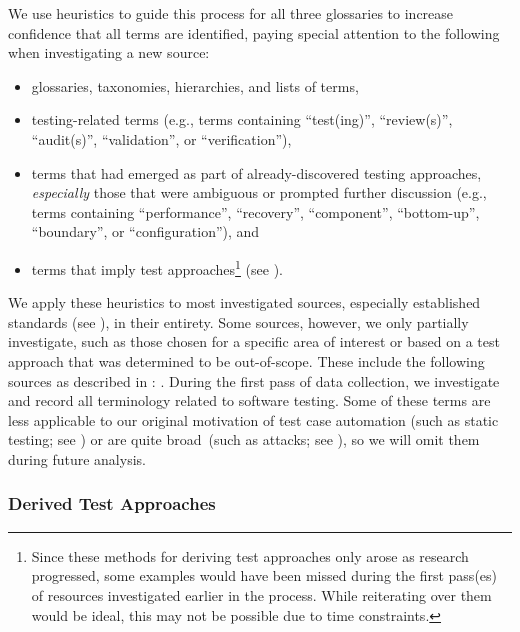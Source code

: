 We use heuristics to guide this process for all three
glossaries to increase confidence that all terms are identified, paying
special attention to the following when investigating a new source:
\begin{itemize}
    \item glossaries, taxonomies, hierarchies, and lists of terms,
    \item testing-related terms (e.g., terms containing ``test(ing)'',
          \ifnotpaper ``review(s)'', ``audit(s)'', \fi
          ``validation'', or ``verification''),
    \item terms that had emerged as part of already-discovered
          testing approaches, \emph{especially} those that were ambiguous
          or prompted further discussion (e.g., terms containing
          ``performance'', ``recovery'', ``component'', ``bottom-up'',
          \ifnotpaper ``boundary'', \fi or ``configuration''), and
    \item terms that imply test approaches\ifnotpaper\footnote{
                  Since these methods for deriving test approaches only arose
                  as research progressed, some examples would have been missed
                  during the first pass(es) of resources investigated earlier
                  in the process. While reiterating over them would be ideal,
                  this may not be possible due to time constraints.
              } (see )\fi.
\end{itemize}
We apply these heuristics to most investigated sources, especially established
standards (see ), in their entirety. Some sources, however, we only
partially investigate, such as those chosen for a specific area of
interest or based on a test approach that was determined to be out-of-scope.
These include the following sources as described in :
\citet{ISO2022,ISO2015,Dominguez-PumarEtAl2020,PierreEtAl2017,
    TrudnowskiEtAl2017,YuEtAl2011,Tsui2007,Goralski1999}.
During the first pass of data collection, we investigate and record all
terminology related to software testing. Some of these terms are less
applicable to our original motivation of test case automation \ifnotpaper
    (such as static testing; see ) \fi or
are quite broad\ifnotpaper\ (such as attacks; see
    )\fi, so we will omit them during future
analysis.

\subsubsection{Derived Test Approaches}\label{derived-tests}

